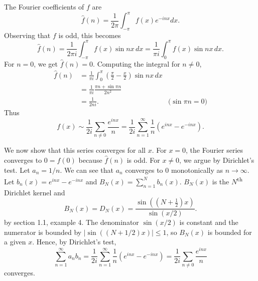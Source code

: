 \documentclass[oneside]{article}
\newcommand\abs[1]{\left|#1\right|}
\begin{document}
  The Fourier coefficients of $f$ are\[
    \hat f(n) = \frac{1}{2\pi}\int_{-\pi}^\pi f(x) e^{-inx} dx\text{.}
  \] Observing that $f$ is odd, this becomes\[
    \hat f(n) = \frac{1}{2\pi i}\int_{-\pi}^\pi f(x) \sin nx\,dx
    = \frac{1}{\pi i}\int_0^\pi f(x) \sin nx\,dx \text{.}
  \] For $n=0$, we get $\hat f(n) = 0$. Computing the integral for $n \neq 0$,
  \begin{align*}
    \hat f(n)
    &= \frac{1}{\pi i}\int_0^\pi\left(\frac\pi2-\frac x2\right)\sin nx\,dx \\
    &= \frac{1}{\pi i}\frac{\pi n + \sin \pi n}{2n^2} \\
    &= \frac{1}{2ni}\text{.} &\text{($\sin\pi n = 0$)}
  \end{align*} Thus\[
    f(x) \sim \frac{1}{2i}\sum_{n\neq0} \frac{e^{inx}}{n}
    = \frac{1}{2i} \sum_{n=1}^\infty \frac1n\left(e^{inx} - e^{-inx}\right)
    \text{.}
  \]

  We now show that this series converges for all $x$. For $x=0$, the Fourier
  series converges to $0 = f(0)$ because $\hat f(n)$ is odd. For $x\neq 0$, we
  argue by Dirichlet's test. Let $a_n = 1/n$. We can see that $a_n$ converges to
  $0$ monotonically as $n\to\infty$. Let $b_n(x) = e^{inx} - e^{-inx}$ and
  $B_N(x) = \sum_{n=1}^N b_n(x)$. $B_N(x)$ is the $N$\textsuperscript{th}
  Dirichlet kernel and\[
    B_N(x) = D_N(x) = \frac{\sin((N+\frac12)x)}{\sin(x/2)}\text{.}
  \] by section 1.1, example 4. The denominator $\sin(x/2)$ is constant and the
  numerator is bounded by $\abs{\sin((N+1/2)x)} \leq 1$, so $B_N(x)$ is bounded
  for a given $x$. Hence, by Dirichlet's test,\[
    \sum_{n=1}^\infty a_nb_n
    = \frac{1}{2i} \sum_{n=1}^\infty \frac1n\left(e^{inx} - e^{-inx}\right)
    = \frac{1}{2i}\sum_{n\neq0} \frac{e^{inx}}{n}
  \] converges.
\end{document}

